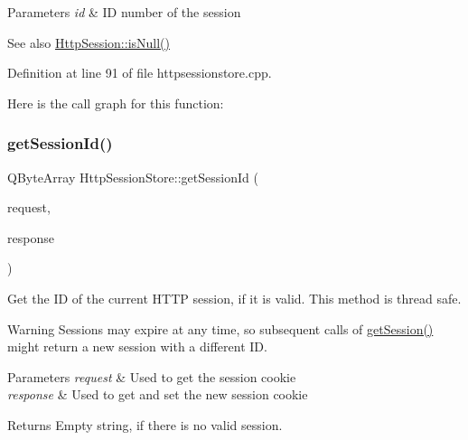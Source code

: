 \begin{DoxyParams}{Parameters}
{\em id} & ID number of the session \\
\hline
\end{DoxyParams}
\begin{DoxySeeAlso}{See also}
\mbox{\hyperlink{classstefanfrings_1_1_http_session_a195963a20805ad00e0eacd90c0194d84}{Http\+Session\+::is\+Null()}} 
\end{DoxySeeAlso}


Definition at line 91 of file httpsessionstore.\+cpp.

Here is the call graph for this function\+:
\mbox{\label{classstefanfrings_1_1_http_session_store_aaf9147137698db03b322ea93de548fba}} 
\subsubsection{\texorpdfstring{get\+Session\+Id()}{getSessionId()}}
{\footnotesize\ttfamily Q\+Byte\+Array Http\+Session\+Store\+::get\+Session\+Id (\begin{DoxyParamCaption}\item[{\mbox{\hyperlink{classstefanfrings_1_1_http_request}{Http\+Request}} \&}]{request,  }\item[{\mbox{\hyperlink{classstefanfrings_1_1_http_response}{Http\+Response}} \&}]{response }\end{DoxyParamCaption})}

Get the ID of the current H\+T\+TP session, if it is valid. This method is thread safe. \begin{DoxyWarning}{Warning}
Sessions may expire at any time, so subsequent calls of \mbox{\hyperlink{classstefanfrings_1_1_http_session_store_aeaf8409e1844366c12f18fd34d477a31}{get\+Session()}} might return a new session with a different ID. 
\end{DoxyWarning}

\begin{DoxyParams}{Parameters}
{\em request} & Used to get the session cookie \\
\hline
{\em response} & Used to get and set the new session cookie \\
\hline
\end{DoxyParams}
\begin{DoxyReturn}{Returns}
Empty string, if there is no valid session. 
\end{DoxyReturn}


